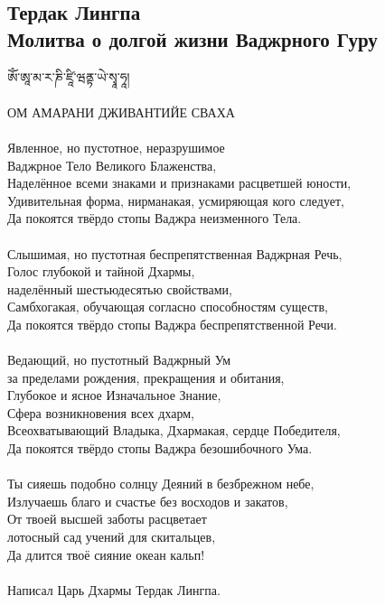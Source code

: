 \subsection{Тердак Лингпа\\Молитва о долгой жизни Ваджрного Гуру}
\vspace{1cm}
\ti
ཨོཾ་ཨཱ་མ་ར་ཎི་ཛཱི་ཝནྟ་ཡེ་སྭཱ་ཧཱ།\\
\\
\ru ОМ АМАРАНИ ДЖИВАНТИЙЕ СВАХА\\
\\
Явленное, но пустотное, неразрушимое \\ \indent Ваджрное Тело Великого Блаженства,\\
Наделённое всеми знаками и признаками расцветшей юности,\\
Удивительная форма, нирманакая, усмиряющая кого следует,\\
Да покоятся твёрдо стопы Ваджра неизменного Тела.\\
\\
Слышимая, но пустотная беспрепятственная Ваджрная Речь,\\
Голос глубокой и тайной Дхармы, \\ \indent наделённый шестьюдесятью свойствами,\\
Самбхогакая, обучающая согласно способностям существ,\\
Да покоятся твёрдо стопы Ваджра беспрепятственной Речи.\\
\\
Ведающий, но пустотный Ваджрный Ум \\ \indent за пределами рождения, прекращения и обитания,\\
Глубокое и ясное Изначальное Знание, \\ \indent Сфера возникновения всех дхарм,\\
Всеохватывающий Владыка, Дхармакая, сердце Победителя,\\
Да покоятся твёрдо стопы Ваджра безошибочного Ума.\\
\\
Ты сияешь подобно солнцу Деяний в безбрежном небе,\\
Излучаешь благо и счастье без восходов и закатов,\\
От твоей высшей заботы расцветает \\ \indent лотосный сад учений для скитальцев,\\
Да длится твоё сияние океан кальп!\\
\\
\scriptsize
Написал Царь Дхармы Тердак Лингпа.
\normalsize
\newpage
